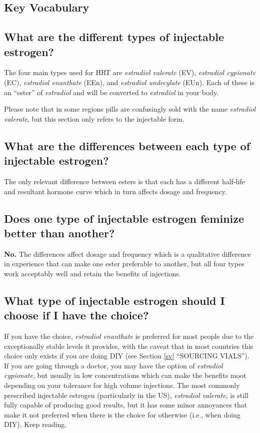 \documentclass{article}
\begin{document}
\subsection*{Key Vocabulary}

\subsection{What are the different types of injectable estrogen?}

The four main types used for HRT are \textit{estradiol valerate} (EV), \textit{estradiol cypionate} (EC), \textit{estradiol enanthate} (EEn), and \textit{estradiol undecylate} (EUn). Each of these is an “ester” of \textit{estradiol} and will be converted to \textit{estradiol} in your body. 

Please note that in some regions pills are confusingly sold with the name \textit{estradiol valerate}, but this section only refers to the injectable form.

\subsection{What are the differences between each type of injectable estrogen?}

The only relevant difference between esters is that each has a different half-life and resultant hormone curve which in turn affects dosage and frequency.

\subsection{Does one type of injectable estrogen feminize better than another?}

\textbf{No.} The differences affect dosage and frequency which is a qualitative difference in experience that can make one ester preferable to another, but all four types work acceptably well and retain the benefits of injections. 

\subsection{What type of injectable estrogen should I choose if I have the choice?}

If you have the choice, \textit{estradiol enanthate} is preferred for most people due to the exceptionally stable levels it provides, with the caveat that in most countries this choice only exists if you are doing DIY (see Section \ref{sv} “SOURCING VIALS”). If you are going through a doctor, you may have the option of \textit{estradiol cypionate}, but usually in low concentrations which can make the benefits moot depending on your tolerance for high volume injections. The most commonly prescribed injectable estrogen (particularly in the US), \textit{estradiol valerate}, is still fully capable of producing good results, but it has some minor annoyances that make it not preferred when there is the choice for otherwise (i.e., when doing DIY). Keep reading.
\end{document}
